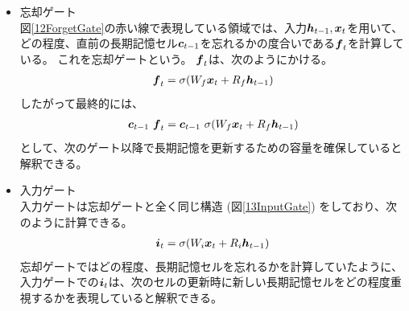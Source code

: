 \begin{itemize}
  \item 忘却ゲート\\
  図\ref{12ForgetGate}の赤い線で表現している領域では、入力${\mbox{\boldmath{$h$}}}_{t-1},{\mbox{\boldmath{$x$}}}_t$を用いて、どの程度、直前の長期記憶セル${\mbox{\boldmath{$c$}}}_{t-1}$を忘れるかの度合いである${\mbox{\boldmath{$f$}}}_{t}$を計算している。
  これを忘却ゲートという。
  ${\mbox{\boldmath{$f$}}}_{t}$は、次のようにかける。
\begin{equation}
 \begin{split}
  {\mbox{\boldmath{$f$}}}_{t} = \sigma (W_f {\mbox{\boldmath{$x$}}}_t + R_f {\mbox{\boldmath{$h$}}}_{t-1})
 \end{split}
\end{equation}  
  したがって最終的には、
\begin{equation}
 \begin{split}
  {\mbox{\boldmath{$c$}}}_{t-1} \  {\mbox{\boldmath{$f$}}}_{t} 
  = {\mbox{\boldmath{$c$}}}_{t-1} \  \sigma (W_f {\mbox{\boldmath{$x$}}}_t + R_f {\mbox{\boldmath{$h$}}}_{t-1})
 \end{split}
\end{equation}
  として、次のゲート以降で長期記憶を更新するための容量を確保していると解釈できる。

  \item 入力ゲート\\
  入力ゲートは忘却ゲートと全く同じ構造 (図\ref{13InputGate}) をしており、次のように計算できる。
\begin{equation}
 \begin{split}
  {\mbox{\boldmath{$i$}}}_{t} = \sigma (W_i {\mbox{\boldmath{$x$}}}_t + R_i {\mbox{\boldmath{$h$}}}_{t-1})
 \end{split}
\end{equation}
  忘却ゲートではどの程度、長期記憶セルを忘れるかを計算していたように、入力ゲートでの${\mbox{\boldmath{$i$}}}_{t}$は、次のセルの更新時に新しい長期記憶セルをどの程度重視するかを表現していると解釈できる。
    

\end{itemize}
